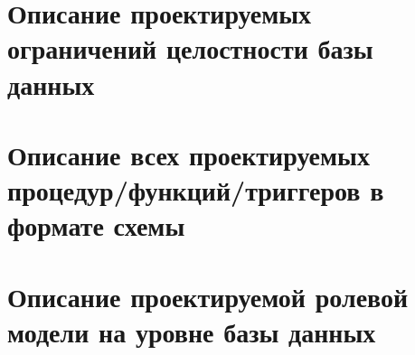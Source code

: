 \section{Описание проектируемых ограничений целостности базы данных}
\section{Описание всех проектируемых процедур/функций/триггеров в формате схемы}

\section{Описание проектируемой ролевой модели на уровне базы данных}
